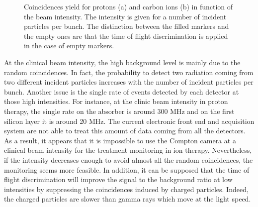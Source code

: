 \documentclass[11pt]{iopart}
\begin{document}
\begin{figure} [!h]
\caption{Coincidences yield for protons (a) and carbon ions (b) in function of the beam intensity. The intensity is given for a number of incident particles per bunch.  The distinction between the filled markers and the empty ones are that the time of flight discrimination is applied in the case of empty markers.}
  \label{fig:coincidences}
\end{figure}

\newpage
At the clinical beam intensity, the high background level is mainly due to the random coincidences. In fact, the probability to detect two radiation coming from two different incident particles increases with the number of incident particles per bunch. Another issue is the single rate of events detected by each detector at those high intensities. For instance, at the clinic beam intensity in proton therapy, the single rate on the absorber is around 300 MHz and on the first silicon layer it is around 20 MHz. The current electronic front end and acquisition system are not able to treat this amount of data coming from all the detectors. As a result, it appears that it is impossible to use the Compton camera at a clinical beam intensity for the treatment monitoring in ion therapy.\newline
Nevertheless, if the intensity decreases enough to avoid almost all the random coincidences, the monitoring seems more feasible. In addition, it can be supposed that the time of flight discrimination will improve the signal to the background ratio at low intensities by suppressing the coincidences induced by charged particles. Indeed, the charged particles are slower than gamma rays which move at the light speed.\newline
\end{document}
